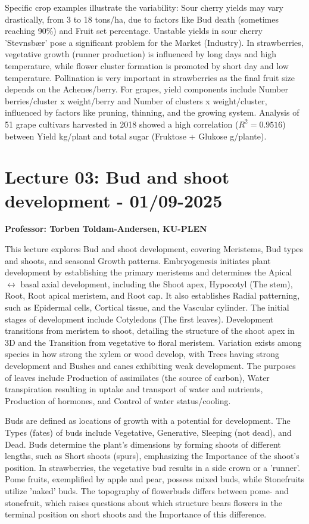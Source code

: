 \vspace{0.5em}
Specific crop examples illustrate the variability: Sour cherry yields may vary drastically, from 3 to 18 tons/ha, due to factors like Bud death (sometimes reaching 90\%) and Fruit set percentage. Unstable yields in sour cherry 'Stevnsbær' pose a significant problem for the Market (Industry). In strawberries, vegetative growth (runner production) is influenced by long days and high temperature, while flower cluster formation is promoted by short day and low temperature. Pollination is very important in strawberries as the final fruit size depends on the Achenes/berry. For grapes, yield components include Number berries/cluster x weight/berry and Number of clusters x weight/cluster, influenced by factors like pruning, thinning, and the growing system. Analysis of 51 grape cultivars harvested in 2018 showed a high correlation ($R^2=0.9516$) between Yield kg/plant and total sugar (Fruktose + Glukose g/plante).


\section{Lecture 03: Bud and shoot development - 01/09-2025}
\textbf{ Professor: Torben Toldam-Andersen, KU-PLEN}

\vspace{1em}
This lecture explores Bud and shoot development, covering Meristems, Bud types and shoots, and seasonal Growth patterns. Embryogenesis initiates plant development by establishing the primary meristems and determines the Apical $\leftrightarrow$ basal axial development, including the Shoot apex, Hypocotyl (The stem), Root, Root apical meristem, and Root cap. It also establishes Radial patterning, such as Epidermal cells, Cortical tissue, and the Vascular cylinder. The initial stages of development include Cotyledons (The first leaves). Development transitions from meristem to shoot, detailing the structure of the shoot apex in 3D and the Transition from vegetative to floral meristem. Variation exists among species in how strong the xylem or wood develop, with Trees having strong development and Bushes and canes exhibiting weak development. The purposes of leaves include Production of assimilates (the source of carbon), Water transpiration resulting in uptake and transport of water and nutrients, Production of hormones, and Control of water status/cooling.

\vspace{0.5em}
Buds are defined as locations of growth with a potential for development. The Types (fates) of buds include Vegetative, Generative, Sleeping (not dead), and Dead. Buds determine the plant's dimensions by forming shoots of different lengths, such as Short shoots (spurs), emphasizing the Importance of the shoot's position. In strawberries, the vegetative bud results in a side crown or a 'runner'. Pome fruits, exemplified by apple and pear, possess mixed buds, while Stonefruits utilize 'naked' buds. The topography of flowerbuds differs between pome- and stonefruit, which raises questions about which structure bears flowers in the terminal position on short shoots and the Importance of this difference.

